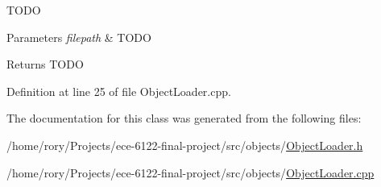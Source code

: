 T\+O\+DO 
\begin{DoxyParams}{Parameters}
{\em filepath} & T\+O\+DO \\
\hline
\end{DoxyParams}
\begin{DoxyReturn}{Returns}
T\+O\+DO 
\end{DoxyReturn}


Definition at line 25 of file Object\+Loader.\+cpp.



The documentation for this class was generated from the following files\+:\begin{DoxyCompactItemize}
\item 
/home/rory/\+Projects/ece-\/6122-\/final-\/project/src/objects/\hyperlink{_object_loader_8h}{Object\+Loader.\+h}\item 
/home/rory/\+Projects/ece-\/6122-\/final-\/project/src/objects/\hyperlink{_object_loader_8cpp}{Object\+Loader.\+cpp}\end{DoxyCompactItemize}
